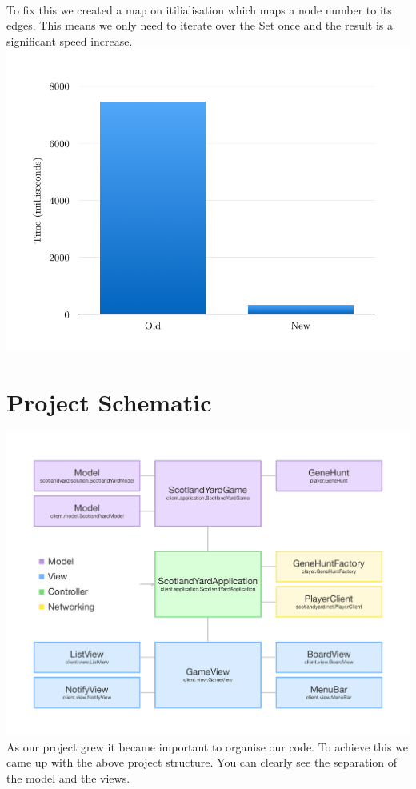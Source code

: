 \documentclass[a4paper, 12pt]{article}
\begin{document}
\\
To fix this we created a map on itilialisation which maps a node number to its edges. This means we only need to iterate over the Set once and the result is a significant speed increase.\\
\includegraphics[width = 14cm]{comparison}
\section{Project Schematic}
\includegraphics[width = 17cm]{mvp_schematic}\\
As our project grew it became important to organise our code. To achieve this we came up with the above project structure. You can clearly see the separation of the model and the views.
\end{document}
